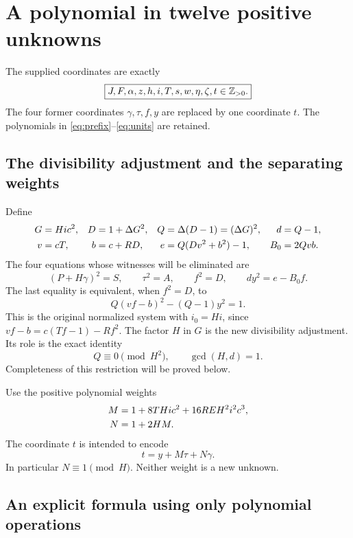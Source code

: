 \section{A polynomial in twelve positive unknowns}\label{sec:twelve}

The supplied coordinates are exactly
\[
 \boxed{J,F,\alpha,z,h,i,T,s,w,\eta,\zeta,t\in\mathbb Z_{>0}.}
\]
The four former coordinates $\gamma,\tau,f,y$ are replaced by one coordinate
$t$. The polynomials in \eqref{eq:prefix}--\eqref{eq:units} are retained.

\subsection{The divisibility adjustment and the separating weights}

Define
\begin{align}
 G&=Hic^2,&D&=1+\Delta G^2,& Q&=\Delta(D-1)=(\Delta G)^2,
 &d&=Q-1,\notag\\
 v&=cT,&b&=c+RD,&e&=Q(Dv^2+b^2)-1,&B_0&=2Qvb.
 \label{eq:aux12}
\end{align}
The four equations whose witnesses will be eliminated are
\begin{equation}
 (P+H\gamma)^2=S,\qquad \tau^2=A,\qquad f^2=D,
 \qquad dy^2=e-B_0f.\label{eq:fourroots}
\end{equation}
The last equality is equivalent, when $f^2=D$, to
\[
 Q(vf-b)^2-(Q-1)y^2=1.
\]
This is the original normalized system with $i_0=Hi$, since
$vf-b=c(Tf-1)-Rf^2$. The factor $H$ in $G$ is the new divisibility
adjustment. Its role is the exact identity
\begin{equation}
 Q\equiv0\pmod{H^2},\qquad \gcd(H,d)=1.\label{eq:coprime}
\end{equation}
Completeness of this restriction will be proved below.

Use the positive polynomial weights
\begin{align}
 M&=1+8THic^2+16REH^2i^2c^3,\notag\\
 N&=1+2HM.\label{eq:weights12}
\end{align}
The coordinate $t$ is intended to encode
\begin{equation}
 t=y+M\tau+N\gamma.\label{eq:trace}
\end{equation}
In particular $N\equiv1\pmod H$. Neither weight is a new unknown.

\subsection{An explicit formula using only polynomial operations}

